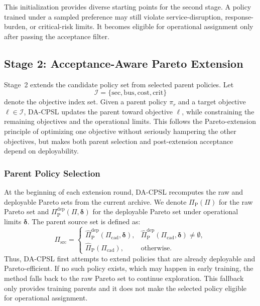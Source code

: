 \documentclass[sigconf,review,anonymous]{acmart}
\begin{document}
This initialization provides diverse starting points for the second stage.
A policy trained under a sampled preference may still violate service-disruption, response-burden, or critical-risk limits. It becomes eligible for operational assignment only after passing the acceptance filter.

\subsection{Stage 2: Acceptance-Aware Pareto Extension}
\label{subsec:dacpsl-stage2}

Stage~2 extends the candidate policy set from selected parent policies.
Let
\[
\mathcal{I}
=
\{
\mathrm{sec},
\mathrm{bus},
\mathrm{cost},
\mathrm{crit}
\}
\]
denote the objective index set. Given a parent policy \(\pi_r\) and a
target objective \(\ell\in\mathcal{I}\), DA-CPSL updates the parent
toward objective \(\ell\), while constraining the remaining objectives
and the operational limits. This follows the Pareto-extension principle
of optimizing one objective without seriously hampering the other
objectives, but makes both parent selection and post-extension acceptance
depend on deployability.

\subsubsection{Parent Policy Selection}
\label{subsubsec:parent-policy-selection}

At the beginning of each extension round, DA-CPSL recomputes the raw and deployable Pareto sets from the current archive.
We denote \(\Pi_{\mathrm{P}}(\Pi)\) for the raw Pareto set and \(\Pi_{\mathrm{P}}^{\mathrm{dep}}(\Pi,\boldsymbol{\delta})\) for the deployable Pareto set under operational limits \(\boldsymbol{\delta}\).
The parent source set is defined as:
\begin{equation}
\Pi_{\mathrm{src}}
=
\begin{cases}
\widehat{\Pi}_{\mathrm{P}}^{\mathrm{dep}}
(\Pi_{\mathrm{cad}},\boldsymbol{\delta}),
&
\widehat{\Pi}_{\mathrm{P}}^{\mathrm{dep}}
(\Pi_{\mathrm{cad}},\boldsymbol{\delta})
\neq
\emptyset,
\\
\widehat{\Pi}_{\mathrm{P}}(\Pi_{\mathrm{cad}}),
&
\text{otherwise}.
\end{cases}
\label{eq:parent-source-set}
\end{equation}
Thus, DA-CPSL first attempts to extend policies that are already deployable and Pareto-efficient.
If no such policy exists, which may happen in early training, the method falls back to the raw Pareto set to continue exploration.
This fallback only provides training parents and it does not make the selected policy eligible for operational assignment.
\end{document}
